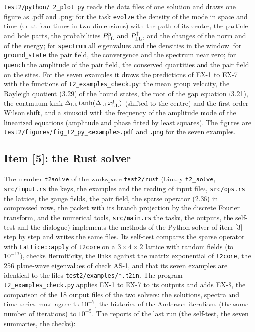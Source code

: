 \documentclass[
  10pt,
]{article}
\begin{document}
\texttt{test2/python/t2\_plot.py} reads the data files of one solution
and draws one figure as .pdf and .png: for the task \texttt{evolve} the
density of the mode in space and time (or at four times in two
dimensions) with the path of its centre, the particle and hole parts,
the probabilities \(P^{\rm h}_{\rm LL}\) and \(P^\uparrow_{\rm LL}\),
and the changes of the norm and of the energy; for \texttt{spectrum} all
eigenvalues and the densities in the window; for \texttt{ground\_state}
the pair field, the convergence and the spectrum near zero; for
\texttt{quench} the amplitude of the pair field, the conserved
quantities and the pair field on the sites. For the seven examples it
draws the predictions of EX-1 to EX-7 with the functions of
\texttt{t2\_examples\_check.py}: the mean group velocity, the Rayleigh
quotient (3.29) of the bound states, the root of the gap equation
(3.21), the continuum kink
\(\Delta_{\rm LL}\tanh(\Delta_{\rm LL}x^1_{\rm LL})\) (shifted to the
centre) and the first-order Wilson shift, and a sinusoid with the
frequency of the amplitude mode of the linearized equations (amplitude
and phase fitted by least squares). The figures are
\texttt{test2/figures/fig\_t2\_py\_\textless{}example\textgreater{}.pdf}
and \texttt{.png} for the seven examples.

\hypertarget{item-5-the-rust-solver}{%
\subsection{Item {[}5{]}: the Rust
solver}\label{item-5-the-rust-solver}}

The member \texttt{t2solve} of the workspace \texttt{test2/rust} (binary
\texttt{t2\_solve}; \texttt{src/input.rs} the keys, the examples and the
reading of input files, \texttt{src/ops.rs} the lattice, the gauge
fields, the pair field, the sparse operator (2.36) in compressed rows,
the packet with its branch projection by the discrete Fourier transform,
and the numerical tools, \texttt{src/main.rs} the tasks, the outputs,
the self-test and the dialogue) implements the methods of the Python
solver of item {[}3{]} step by step and writes the same files. Its
self-test compares the sparse operator with \texttt{Lattice::apply} of
\texttt{t2core} on a \(3\times4\times2\) lattice with random fields (to
\(10^{-13}\)), checks Hermiticity, the links against the matrix
exponential of \texttt{t2core}, the 256 plane-wave eigenvalues of check
AS-1, and that its seven examples are identical to the files
\texttt{test2/examples/*.t2in}. The program
\texttt{t2\_examples\_check.py} applies EX-1 to EX-7 to its outputs and
adds EX-8, the comparison of the 18 output files of the two solvers: the
solutions, spectra and time series must agree to \(10^{-7}\), the
histories of the Anderson iterations (the same number of iterations) to
\(10^{-5}\). The reports of the last run (the self-test, the seven
summaries, the checks):
\end{document}
